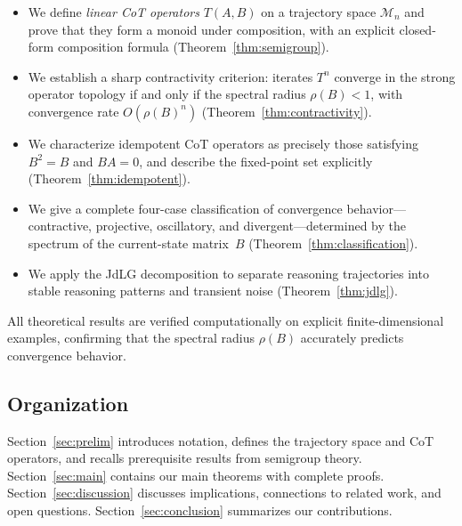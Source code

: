 \begin{itemize}[leftmargin=*,itemsep=2pt,topsep=2pt]
\item We define \emph{linear CoT operators} $T(A,B)$ on a trajectory space
  $\mathcal{M}_n$ and prove that they form a monoid under composition, with an
  explicit closed-form composition formula
  (Theorem~\ref{thm:semigroup}).

\item We establish a sharp contractivity criterion: iterates $T^n$ converge in
  the strong operator topology if and only if the spectral radius
  $\rho(B)<1$, with convergence rate $O(\rho(B)^n)$
  (Theorem~\ref{thm:contractivity}).

\item We characterize idempotent CoT operators as precisely those satisfying
  $B^2=B$ and $BA=0$, and describe the fixed-point set explicitly
  (Theorem~\ref{thm:idempotent}).

\item We give a complete four-case classification of convergence
  behavior---contractive, projective, oscillatory, and
  divergent---determined by the spectrum of the current-state matrix~$B$
  (Theorem~\ref{thm:classification}).

\item We apply the JdLG decomposition to separate reasoning trajectories into
  stable reasoning patterns and transient noise
  (Theorem~\ref{thm:jdlg}).
\end{itemize}

All theoretical results are verified computationally on explicit
finite-dimensional examples, confirming that the spectral radius $\rho(B)$
accurately predicts convergence behavior.

\subsection*{Organization}
Section~\ref{sec:prelim} introduces notation, defines the trajectory space and
CoT operators, and recalls prerequisite results from semigroup theory.
Section~\ref{sec:main} contains our main theorems with complete proofs.
Section~\ref{sec:discussion} discusses implications, connections to related
work, and open questions. Section~\ref{sec:conclusion} summarizes our
contributions.

